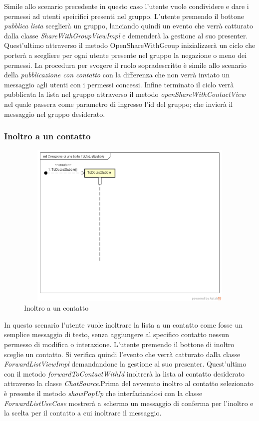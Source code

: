 Simile allo scenario precedente in questo caso l'utente vuole condividere e dare i permessi ad utenti speicifici presenti nel gruppo. L'utente premendo il bottone \textit{pubblica lista} sceglierà un gruppo, lanciando quindi un evento che verrà catturato dalla classe \textit{ShareWithGroupViewImpl}
\newpage e demenderà la gestione al suo presenter. Quest'ultimo attraverso il metodo OpenShareWithGroup inizializzerà un ciclo che porterà a scegliere per ogni utente presente nel gruppo la negazione o meno dei permessi. La procedura per svogere il ruolo sopradescritto è simile allo scenario della \textit{pubblicazione con contatto} con la differenza che non verrà inviato un messaggio agli utenti con i permessi concessi. Infine terminato il ciclo verrà pubblicata la lista nel gruppo attraverso il metodo \textit{openShareWithContactView} nel quale passera come parametro di ingresso l'id del gruppo; che invierà il messaggio nel gruppo desiderato.

\subsubsection{Inoltro a un contatto}

\label{Inoltro a un contatto}
\begin{figure}[H]
	\centering
	\includegraphics[width=12cm, height=8cm]{Sezioni/Diagrammi/img/Creazione di una bolla ToDoListBubble.png}
	\caption{Inoltro a un contatto}
	
\end{figure}

In questo scenario l'utente vuole inoltrare la lista a un contatto come fosse un semplice messaggio di testo, senza aggiungere al specifico contatto nessun permesso di modifica o interazione. L'utente premendo il bottone di inoltro sceglie un contatto. Si verifica quindi l'evento che verrà catturato dalla classe \textit{ForwardListViewImpl} demandandone la gestione al suo presenter.
Quest'ultimo con il metodo \textit{forwardToContactWithId} inoltrerà la lista al contatto desiderato attraverso la classe \textit{ChatSource}.Prima del avvenuto inoltro al contatto selezionato è presente il metodo \textit{showPopUp} che interfaciandosi con la classe \textit{ForwardListUseCase} mostrerà a schermo un messaggio di conferma per l'inoltro e la scelta per il contatto a cui inoltrare il messaggio.



